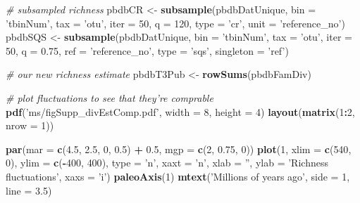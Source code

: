 \documentclass[]{article}
\newenvironment{Shaded}{\begin{snugshade}}{\end{snugshade}}
\newcommand{\KeywordTok}[1]{\textcolor[rgb]{0.13,0.29,0.53}{\textbf{#1}}}
\newcommand{\DataTypeTok}[1]{\textcolor[rgb]{0.13,0.29,0.53}{#1}}
\newcommand{\DecValTok}[1]{\textcolor[rgb]{0.00,0.00,0.81}{#1}}
\newcommand{\FloatTok}[1]{\textcolor[rgb]{0.00,0.00,0.81}{#1}}
\newcommand{\StringTok}[1]{\textcolor[rgb]{0.31,0.60,0.02}{#1}}
\newcommand{\CommentTok}[1]{\textcolor[rgb]{0.56,0.35,0.01}{\textit{#1}}}
\newcommand{\OperatorTok}[1]{\textcolor[rgb]{0.81,0.36,0.00}{\textbf{#1}}}
\newcommand{\NormalTok}[1]{#1}
\begin{document}
\begin{Shaded}
\begin{Highlighting}[]
\CommentTok{# subsampled richness}
\NormalTok{pbdbCR <-}\StringTok{ }\KeywordTok{subsample}\NormalTok{(pbdbDatUnique, }\DataTypeTok{bin =} \StringTok{'tbinNum'}\NormalTok{, }\DataTypeTok{tax =} \StringTok{'otu'}\NormalTok{, }\DataTypeTok{iter =} \DecValTok{50}\NormalTok{, }\DataTypeTok{q =} \DecValTok{120}\NormalTok{, }
                    \DataTypeTok{type =} \StringTok{'cr'}\NormalTok{, }\DataTypeTok{unit =} \StringTok{'reference_no'}\NormalTok{)}
\NormalTok{pbdbSQS <-}\StringTok{ }\KeywordTok{subsample}\NormalTok{(pbdbDatUnique, }\DataTypeTok{bin =} \StringTok{'tbinNum'}\NormalTok{, }\DataTypeTok{tax =} \StringTok{'otu'}\NormalTok{, }\DataTypeTok{iter =} \DecValTok{50}\NormalTok{, }\DataTypeTok{q =} \FloatTok{0.75}\NormalTok{, }
                     \DataTypeTok{ref =} \StringTok{'reference_no'}\NormalTok{, }\DataTypeTok{type =} \StringTok{'sqs'}\NormalTok{, }\DataTypeTok{singleton =} \StringTok{'ref'}\NormalTok{)}

\CommentTok{# our new richness estimate}
\NormalTok{pbdbT3Pub <-}\StringTok{ }\KeywordTok{rowSums}\NormalTok{(pbdbFamDiv)}


\CommentTok{# plot fluctuations to see that they're comprable}
\KeywordTok{pdf}\NormalTok{(}\StringTok{'ms/figSupp_divEstComp.pdf'}\NormalTok{, }\DataTypeTok{width =} \DecValTok{8}\NormalTok{, }\DataTypeTok{height =} \DecValTok{4}\NormalTok{)}
\KeywordTok{layout}\NormalTok{(}\KeywordTok{matrix}\NormalTok{(}\DecValTok{1}\OperatorTok{:}\DecValTok{2}\NormalTok{, }\DataTypeTok{nrow =} \DecValTok{1}\NormalTok{))}

\KeywordTok{par}\NormalTok{(}\DataTypeTok{mar =} \KeywordTok{c}\NormalTok{(}\FloatTok{4.5}\NormalTok{, }\FloatTok{2.5}\NormalTok{, }\DecValTok{0}\NormalTok{, }\FloatTok{0.5}\NormalTok{) }\OperatorTok{+}\StringTok{ }\FloatTok{0.5}\NormalTok{, }\DataTypeTok{mgp =} \KeywordTok{c}\NormalTok{(}\DecValTok{2}\NormalTok{, }\FloatTok{0.75}\NormalTok{, }\DecValTok{0}\NormalTok{))}
\KeywordTok{plot}\NormalTok{(}\DecValTok{1}\NormalTok{, }\DataTypeTok{xlim =} \KeywordTok{c}\NormalTok{(}\DecValTok{540}\NormalTok{, }\DecValTok{0}\NormalTok{), }\DataTypeTok{ylim =} \KeywordTok{c}\NormalTok{(}\OperatorTok{-}\DecValTok{400}\NormalTok{, }\DecValTok{400}\NormalTok{), }\DataTypeTok{type =} \StringTok{'n'}\NormalTok{, }\DataTypeTok{xaxt =} \StringTok{'n'}\NormalTok{, }
     \DataTypeTok{xlab =} \StringTok{''}\NormalTok{, }\DataTypeTok{ylab =} \StringTok{'Richness fluctuations'}\NormalTok{, }\DataTypeTok{xaxs =} \StringTok{'i'}\NormalTok{)}
\KeywordTok{paleoAxis}\NormalTok{(}\DecValTok{1}\NormalTok{)}
\KeywordTok{mtext}\NormalTok{(}\StringTok{'Millions of years ago'}\NormalTok{, }\DataTypeTok{side =} \DecValTok{1}\NormalTok{, }\DataTypeTok{line =} \FloatTok{3.5}\NormalTok{)}


\end{Highlighting}
\end{Shaded}
\end{document}
